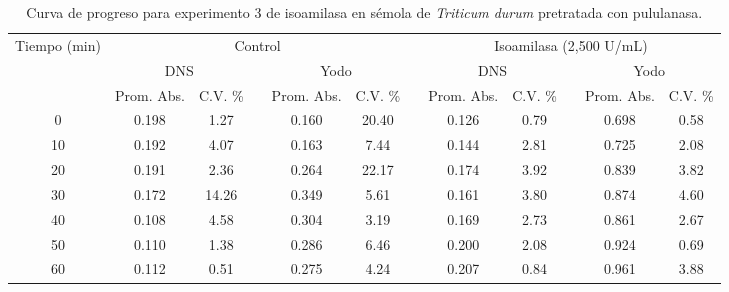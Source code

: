 \documentclass{article}
\begin{document}
\begin{table}[H]
	\centering
	\caption{Curva de progreso para experimento 3 de isoamilasa en sémola de \textit{Triticum durum} pretratada con pululanasa.}
		\begin{adjustbox}{width=\textwidth}
	\begin{tabular}{cccccccccccc}
		\toprule
		\multicolumn{1}{c}{\multirow{3}[6]{*}{Tiempo (min)}} & \multicolumn{5}{c}{Control}           &       & \multicolumn{5}{c}{Isoamilasa (2,500 U/mL)} \\
		\cmidrule{2-6}\cmidrule{8-12}          & \multicolumn{2}{c}{DNS} &       & \multicolumn{2}{c}{Yodo} &       & \multicolumn{2}{c}{DNS} &       & \multicolumn{2}{c}{Yodo} \\
		\cmidrule{2-3}\cmidrule{5-6}\cmidrule{8-9}\cmidrule{11-12}          & Prom. Abs. & C.V. \% &       & Prom. Abs. & C.V. \% &       & Prom. Abs. & C.V. \% &       & Prom. Abs. & C.V. \% \\
		\midrule
		0     & 0.198 & 1.27  &       & 0.160 & 20.40 &       & 0.126 & 0.79  &       & 0.698 & 0.58 \\
		10    & 0.192 & 4.07  &       & 0.163 & 7.44  &       & 0.144 & 2.81  &       & 0.725 & 2.08 \\
		20    & 0.191 & 2.36  &       & 0.264 & 22.17 &       & 0.174 & 3.92  &       & 0.839 & 3.82 \\
		30    & 0.172 & 14.26 &       & 0.349 & 5.61  &       & 0.161 & 3.80  &       & 0.874 & 4.60 \\
		40    & 0.108 & 4.58  &       & 0.304 & 3.19  &       & 0.169 & 2.73  &       & 0.861 & 2.67 \\
		50    & 0.110 & 1.38  &       & 0.286 & 6.46  &       & 0.200 & 2.08  &       & 0.924 & 0.69 \\
		60    & 0.112 & 0.51  &       & 0.275 & 4.24  &       & 0.207 & 0.84  &       & 0.961 & 3.88 \\
		\bottomrule
	\end{tabular}%
	\end{adjustbox}
	\label{tab:e3.2}%
\end{table}%
\end{document}
